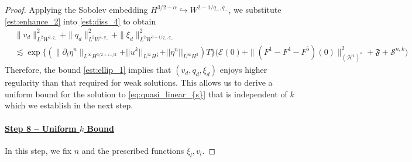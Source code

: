 \documentclass[letterpaper,reqno,10pt,twoside]{amsart}
\theoremstyle{definition}
\theoremstyle{remark}
\def\p{\partial}
\begin{document}
\begin{proof}
		
		Applying the Sobolev embedding $H^{3/2-\alpha}\hookrightarrow W^{2-1/q_-,q_-}$, we substitute \eqref{est:enhance_2} into \eqref{est:diss_4} to obtain
		\begin{equation}\label{est:ellip_1}
			\begin{aligned}
				&\|v_{d}\|_{L^2W^{2,q_-}}^2+\|q_{d}\|_{L^2W^{1,q_-}}^2+\|\xi_{d}\|_{L^2W^{3-1/q_-,q_-}}^2\\
				& \lesssim \exp\big\{(\|\p_t\eta^{n}\|_{L^\infty H^{3/2+\varepsilon_-/2}}+\vert \vert u^{k}\vert \vert_{L^{\infty}H^{\frac{5}{2}}}+\vert \vert \eta^{n}\vert \vert_{L^{\infty}H^{3}})T\big\}\bigg(\mathcal{E}(0)+\|(F^1-F^4-F^5)(0)\|_{(\mathcal{H}^1)^\ast}^2
				+\mathfrak{F}+\mathscr{S}^{n,k}\bigg)
			\end{aligned}
		\end{equation}
		Therefore, the bound \eqref{est:ellip_1} implies that $(v_{d}, q_{d}, \xi_{d})$ enjoys higher regularity than that required for weak solutions. This allows us to derive a uniform bound for the solution to \eqref{eq:quasi_linear_{s}}  that is independent of $k$ which we establish in the next step.
		
		\paragraph{\underline{Step 8 -- Uniform $k$ Bound}}
		
		In this step, we fix $n$ and the prescribed functions $\xi_{l},v_{l}$.
		

\end{proof}
\end{document}
